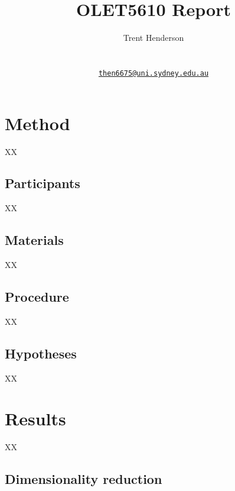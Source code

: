 \documentclass{article}
\title{OLET5610 Report}
\author{
    Trent Henderson
   \\
     \\
   \\
  \texttt{\href{mailto:then6675@uni.sydney.edu.au}{\nolinkurl{then6675@uni.sydney.edu.au}}} \\
  }
\begin{document}
\maketitle

\def\tightlist{}


\begin{abstract}

\end{abstract}


\hypertarget{method}{%
\section{Method}\label{method}}

XX

\hypertarget{participants}{%
\subsection{Participants}\label{participants}}

XX

\hypertarget{materials}{%
\subsection{Materials}\label{materials}}

XX

\hypertarget{procedure}{%
\subsection{Procedure}\label{procedure}}

XX

\hypertarget{hypotheses}{%
\subsection{Hypotheses}\label{hypotheses}}

XX

\hypertarget{results}{%
\section{Results}\label{results}}

XX

\hypertarget{dimensionality-reduction}{%
\subsection{Dimensionality reduction}\label{dimensionality-reduction}}
\end{document}
